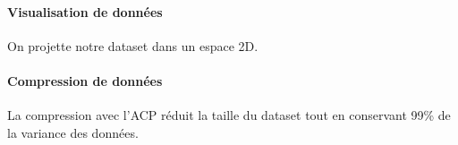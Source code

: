 \paragraph{Visualisation de données}
On projette notre dataset dans un espace 2D.

\begin{figure}[H]
    \centering
    \qquad
\end{figure}

\paragraph{Compression de données}

La compression avec l’ACP réduit la taille du dataset tout en conservant 99\% de la variance des données.

